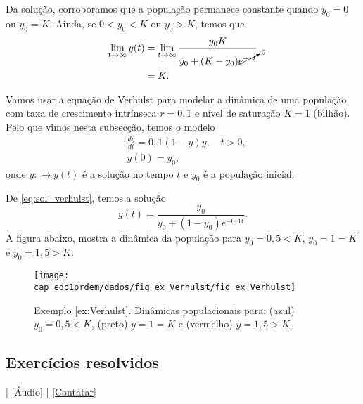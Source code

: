 Da solução, corroboramos que a população permanece constante quando $y_0 = 0$ ou $y_0 = K$. Ainda, se $0<y_0<K$ ou $y_0 > K$, temos que
\begin{align}
  \lim_{t\to\infty} y(t) &= \lim_{t\to\infty} \frac{y_0K}{y_0 + (K-y_0)\cancelto{0}{e^{-rt}}} \\
  &= K.
\end{align}

\begin{ex}\label{ex:Verhulst}
  Vamos usar a equação de Verhulst para modelar a dinâmica de uma população com taxa de crescimento intrínseca $r=0,1$ e nível de saturação $K=1$ (bilhão). Pelo que vimos nesta subsecção, temos o modelo
  \begin{align}
    &\frac{dy}{dt} = 0,1\left(1 - y\right)y,\quad t>0,\\
    &y(0) = y_0,
  \end{align}
  onde $y:\mapsto y(t)$ é a solução no tempo $t$ e $y_0$ é a população inicial.

  De \ref{eq:sol_verhulst}, temos a solução
  \begin{equation}
    y(t) = \frac{y_0}{y_0 + (1-y_0)e^{-0,1t}}.
  \end{equation}
  A figura abaixo, mostra a dinâmica da população para $y_0=0,5<K$, $y_0=1=K$ e $y_0=1,5>K$.

  \begin{figure}[H]
    \centering
    \texttt{[image: cap\_edo1ordem/dados/fig\_ex\_Verhulst/fig\_ex\_Verhulst]}
    \caption{Exemplo \ref{ex:Verhulst}. Dinâmicas populacionais para: (azul) $y_0=0,5<K$, (preto) $y=1=K$ e (vermelho) $y=1,5>K$.}
    \label{fig:ex_Verhulst}
  \end{figure}
\end{ex}

\subsection*{Exercícios resolvidos}

\begin{flushright}
  [Vídeo] | [Áudio] | \href{https://phkonzen.github.io/notas/contato.html}{[Contatar]}
\end{flushright}

